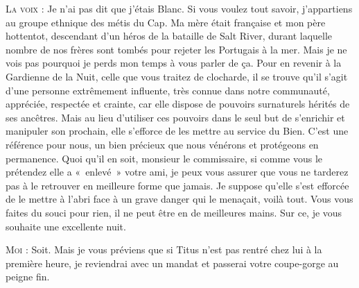 \begin{dialogue}
%
\textsc{La voix} : Je n’ai pas dit que j’étais Blanc. Si vous voulez tout savoir, j’appartiens au groupe ethnique des métis du Cap. Ma mère était française et mon père hottentot, descendant d’un héros de la bataille de Salt River, durant laquelle nombre de nos frères sont tombés pour rejeter les Portugais à la mer. Mais je ne vois pas pourquoi je perds mon temps à vous parler de ça. Pour en revenir à la Gardienne de la Nuit, celle que vous traitez de clocharde, il se trouve qu’il s’agit d’une personne extrêmement influente, très connue dans notre communauté, appréciée, respectée et crainte, car elle dispose de pouvoirs surnaturels hérités de ses ancêtres. Mais au lieu d’utiliser ces pouvoirs dans le seul but de s’enrichir et manipuler son prochain, elle s’efforce de les mettre au service du Bien. C’est une référence pour nous, un bien précieux que nous vénérons et protégeons en permanence. Quoi qu’il en soit, monsieur le commissaire, si comme vous le prétendez elle a «~enlevé~» votre ami, je peux vous assurer que vous ne tarderez pas à le retrouver en meilleure forme que jamais. Je suppose qu’elle s’est efforcée de le mettre à l’abri face à un grave danger qui le menaçait, voilà tout. Vous vous faites du souci pour rien, il ne peut être en de meilleures mains. Sur ce, je vous souhaite une excellente nuit.

\textsc{Moi} : Soit. Mais je vous préviens que si Titus n’est pas rentré chez lui à la première heure, je reviendrai avec un mandat et passerai votre coupe-gorge au peigne fin.


\end{dialogue}
